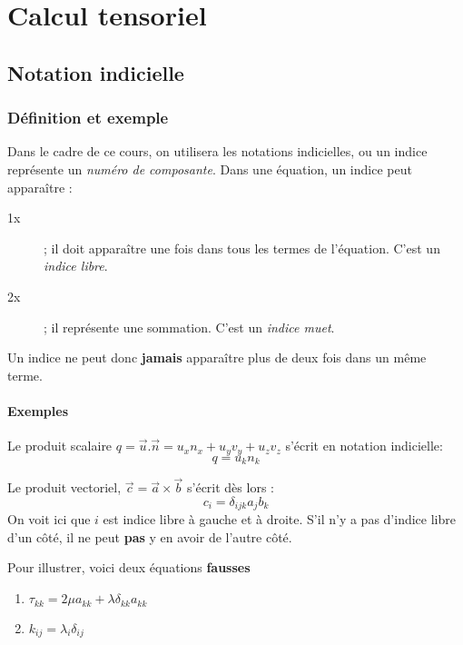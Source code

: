 
\chapter{Calcul tensoriel}
\label{chap:ch1}

\section{Notation indicielle}
    \subsection{Définition et exemple}
    Dans le cadre de ce cours, on utilisera les notations indicielles, ou un indice représente un 
    \textit{numéro de composante}. Dans une équation, un indice peut apparaître :
    
    \begin{description}
    \item[1x]; il doit apparaître une fois dans tous les termes de l'équation. C'est un 
    \textit{indice libre}.
    \item[2x]; il représente une sommation. C'est un \textit{indice muet}.
    \end{description}
    Un indice ne peut donc \textbf{jamais} apparaître plus de deux fois dans un même terme.


        \subsubsection{Exemples}
        Le produit scalaire $q = \vec{u}.\vec{n} = u_xn_x + u_yv_y+u_zv_z$ s'écrit en notation
        indicielle:
        \begin{equation}
        q = u_kn_k
        \end{equation}
        
        Le produit vectoriel, $\vec{c} = \vec{a}\times\vec{b}$ s'écrit dès lors :
        \begin{equation}
        c_i = \delta_{ijk}a_jb_k
        \end{equation}
        On voit ici que $i$ est indice libre à gauche et à droite. S'il n'y a pas d'indice libre
        d'un côté, il ne peut \textbf{pas} y en avoir de l'autre côté.
        
        Pour illustrer, voici deux équations \textbf{fausses}
        \begin{enumerate}
        \item $\tau_{kk} = 2\mu a_{kk} + \lambda\delta_{kk}a_{kk}$
        \item $k_{ij} = \lambda_i\delta_{ij}$
        \end{enumerate}
        
